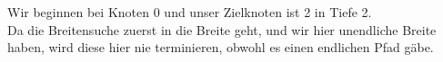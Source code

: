 \documentclass[german,colorful]{ExerciseLua}
\begin{document}
    \begin{exercise}{2}
        Wir beginnen bei Knoten {\color{betterGreen}0} und unser Zielknoten ist {\color{emorot}2} in Tiefe 2.\\
        Da die Breitensuche zuerst in die Breite geht, und wir hier unendliche Breite haben, wird diese hier nie terminieren, obwohl es einen endlichen Pfad gäbe.
        \begin{center}
        \end{center}
    \end{exercise}
\end{document}

